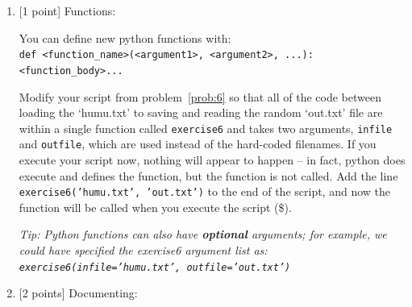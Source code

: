 \documentclass[10pt]{article}
\begin{document}
\begin{enumerate}
\begin{verbatim}
def plot_1d_array(arr):
    plt.figure()
    plt.plot(arr)
\end{verbatim}
Include these two plots, with appropriate captions, in your results (\$).

{\em Note: the shapes of the original {\tt walk.txt} and {\tt walk\_scale01.txt} should be identical, but the y-axis ranges should reflect the original and scaled ranges.}

{\bf Solution.} $<$Solution goes here$>$\\


\item \label{prob:7} [1 point]
Functions:

You can define new python functions with:\\
\hspace*{1cm} {\tt def <function\_name>(<argument1>, <argument2>, ...):}\\
\hspace*{1cm}\hspace{2em} {\tt <function\_body>...}

Modify your script from problem~\ref{prob:6} so that all of the code between loading the `humu.txt' to saving and reading the random `out.txt' file are within a single function called {\tt exercise6} and takes two arguments, {\tt infile} and {\tt outfile}, which are used instead of the hard-coded filenames.  If you execute your script now, nothing will appear to happen -- in fact, python does execute and defines the function, but the function is not called.  Add the line {\tt exercise6('humu.txt', 'out.txt')} to the end of the script, and now the function will be called when you execute the script (\$).

{\em Tip: Python functions can also have {\bf optional} arguments; for example, we could have specified the exercise6 argument list as: {\tt exercise6(infile='humu.txt', outfile='out.txt')}}



\item \label{prob:8} [2 points]
Documenting:


\end{enumerate}
\end{document}
